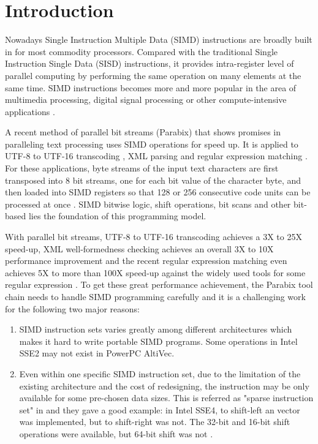 %
%

\chapter{Introduction}
\label{one}

Nowadays Single Instruction Multiple Data (SIMD) instructions are broadly built in for most commodity processors. Compared with the traditional Single Instruction Single Data (SISD) instructions, it provides intra-register level of parallel computing by performing the same operation on many elements at the same time. SIMD instructions becomes more and more popular in the area of multimedia processing, digital signal processing or other compute-intensive applications \cite{hua_idisa}.

A recent method of parallel bit streams (Parabix) that shows promises in paralleling text processing uses SIMD operations for speed up. It is applied to UTF-8 to UTF-16 transcoding \cite{rob_u8u16, rob_u8u16_techreport}, XML parsing \cite{medforth_icxml, rob_xml} and regular expression matching \cite{rob_regex}. For these applications, byte streams of the input text characters are first transposed into 8 bit streams, one for each bit value of the character byte, and then loaded into SIMD registers so that 128 or 256 consecutive code units can be processed at once \cite{inductive_doubling_principle}. SIMD bitwise logic, shift operations, bit scans and other bit-based lies the foundation of this programming model.

With parallel bit streams, UTF-8 to UTF-16 transcoding achieves a 3X to 25X speed-up, XML well-formedness checking achieves an overall 3X to 10X performance improvement \cite{inductive_doubling_principle} and the recent regular expression matching even achieves 5X to more than 100X speed-up against the widely used tools for some regular expression \cite{rob_regex}. To get these great performance achievement, the Parabix tool chain needs to handle SIMD programming carefully and it is a challenging work for the following two major reasons:

\begin{enumerate}
  \item SIMD instruction sets varies greatly among different architectures which makes it hard to write portable SIMD programs. Some operations in Intel SSE2 may not exist in PowerPC AltiVec.
  \item Even within one specific SIMD instruction set, due to the limitation of the existing architecture and the cost of redesigning, the instruction may be only available for some pre-chosen data sizes. This is referred as "sparse instruction set" in \cite{hybrid_simd_type_legalize} and they gave a good example: in Intel SSE4, to shift-left an vector was implemented, but to shift-right was not. The 32-bit and 16-bit shift operations were available, but 64-bit shift was not \cite{hybrid_simd_type_legalize}.
\end{enumerate}

